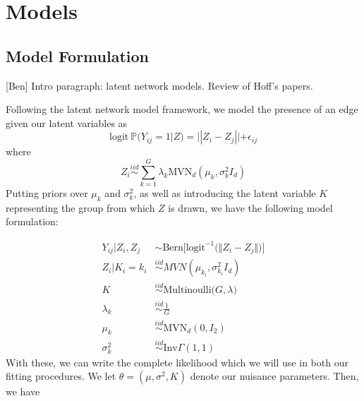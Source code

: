 \documentclass{article}
\begin{document}
\section{Models} \label{Models}


\subsection{Model Formulation}\label{Model Formulation}

[Ben] Intro paragraph: latent network models. Review of Hoff's papers. 

Following the latent network model framework, we model the presence of an edge given our latent variables as
\[\text{logit} \ \mathbb{P}(Y_{ij} = 1|Z) = ||Z_i - Z_j|| + \epsilon_{ij}\]
where
\[Z_i \overset{iid}{\sim}\sum_{k=1}^G \lambda_k\text{MVN}_d(\mu_k,\sigma_k^2I_d)\]
Putting priors over $\mu_k$ and  $\sigma_k^2$, as well as introducing the latent variable $K$ representing the group from which $Z$ is drawn, we have the following model formulation:

\begin{align*}
Y_{ij} | Z_i, Z_j &\sim \text{Bern}\Big[\text{logit}^{-1}\big(\Vert Z_i - Z_j \Vert\big)\Big] \\
Z_i | K_i = k_i &\overset{iid}\sim MVN(\mu_{k_i}, \sigma_{k_i}^2 I_d) \\
K &\overset{iid}\sim \text{Multinoulli}\big(G, \lambda \big) \\
\lambda_k &\overset{iid}\sim \frac{1}{G} \\
\mu_k &\overset{iid}\sim \text{MVN}_d(0, I_2) \\
\sigma_k^2 &\overset{iid}\sim \text{Inv}\Gamma(1,1)
\end{align*}
With these, we can write the complete likelihood which we will use in both our fitting procedures. We let $\theta = (\mu, \sigma^2, K)$ denote our nuisance parameters. Then, we have
\end{document}
